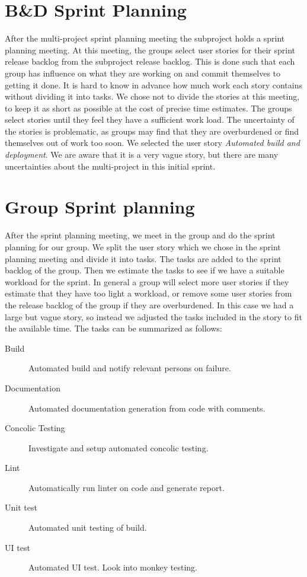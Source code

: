 \section{B\&D Sprint Planning}
After the multi-project sprint planning meeting the \bd subproject holds a sprint planning meeting. At this meeting, the groups select user stories for their sprint release backlog from the \bd subproject release backlog. This is done such that each group has influence on what they are working on and commit themselves to getting it done. It is hard to know in advance how much work each story contains without dividing it into tasks. We chose not to divide the stories at this meeting, to keep it as short as possible at the cost of precise time estimates. The groups select stories until they feel they have a sufficient work load. The uncertainty of the stories is problematic, as groups may find that they are overburdened or find themselves out of work too soon. We selected the user story \emph{Automated build and deployment}. We are aware that it is a very vague story, but there are many uncertainties about the multi-project in this initial sprint.

\section{Group Sprint planning}
After the \bd sprint planning meeting, we meet in the group and do the sprint planning for our group. We split the user story which we chose in the \bd sprint planning meeting and divide it into tasks. The tasks are added to the sprint backlog of the group. Then we estimate the tasks to see if we have a suitable workload for the sprint. In general a group will select more user stories if they estimate that they have too light a workload, or remove some user stories from the release backlog of the group if they are overburdened. In this case we had a large but vague story, so instead we adjusted the tasks included in the story to fit the available time. The tasks can be summarized as follows:

\begin{description}
    \item[Build] Automated build and notify relevant persons on failure.
    \item[Documentation] Automated documentation generation from code with comments.
    \item[Concolic Testing] Investigate and setup automated concolic testing.
    \item[Lint] Automatically run linter on code and generate report.
    \item[Unit test] Automated unit testing of build.
    \item[UI test] Automated UI test. Look into monkey testing. 
\end{description}


